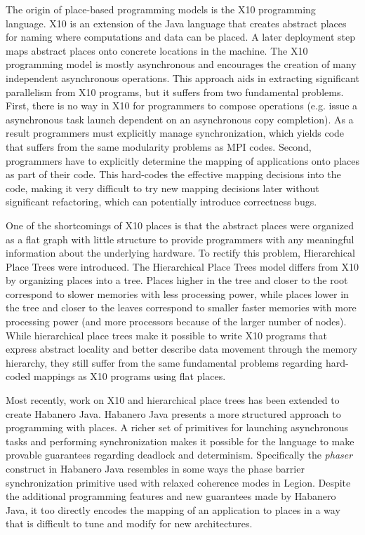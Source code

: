 The origin of place-based programming models
is the X10 programming language\cite{X1005}.
X10 is an extension of the Java language
that creates abstract places for naming where
computations and data can be placed. A later
deployment step maps abstract places onto
concrete locations in the machine. The X10
programming model is mostly asynchronous
and encourages the creation of many independent
asynchronous operations. This approach aids
in extracting significant parallelism from X10
programs, but it suffers from two fundamental
problems. First, there is no way in X10 for
programmers to compose operations (e.g. issue
a asynchronous task launch dependent on an
asynchronous copy completion).  As a result
programmers must explicitly manage synchronization,
which yields code that suffers from the
same modularity problems as MPI codes. Second,
programmers have to explicitly determine the
mapping of applications onto places as part
of their code. This hard-codes the effective
mapping decisions into the code, making it
very difficult to try new mapping decisions
later without significant refactoring, which
can potentially introduce correctness bugs.

One of the shortcomings of X10 places is 
that the abstract places were organized
as a flat graph with little structure to
provide programmers with any meaningful
information about the underlying hardware.
To rectify this problem, Hierarchical
Place Trees\cite{HPT09} were introduced.
The Hierarchical Place Trees model differs from X10
by organizing places into a tree. Places
higher in the tree and closer to the root
correspond to slower memories with less
processing power, while places lower in the 
tree and closer to the leaves correspond to 
smaller faster memories with more processing
power (and more processors because of the
larger number of nodes). While hierarchical
place trees make it possible to write X10 
programs that express abstract locality and better
describe data movement through the memory
hierarchy, they still suffer from the
same fundamental problems regarding hard-coded
mappings as X10 programs using flat places.

Most recently, work on X10 and hierarchical
place trees has been extended to create
Habanero Java\cite{Habanero11}. Habanero
Java presents a more structured approach to
programming with places. A richer set of
primitives for launching asynchronous tasks
and performing synchronization makes it possible
for the language to make provable guarantees
regarding deadlock and determinism. Specifically
the {\em phaser} construct in Habanero Java
resembles in some ways the phase barrier 
synchronization primitive used with relaxed
coherence modes in Legion. Despite the 
additional programming features and new guarantees
made by Habanero Java, it too directly encodes
the mapping of an application to places in a
way that is difficult to tune and modify for
new architectures.


